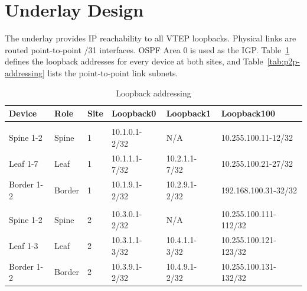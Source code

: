 \section{Underlay Design}
The underlay provides IP reachability to all VTEP loopbacks. Physical links are routed point‑to‑point /31 interfaces. OSPF Area 0 is used as the IGP. Table~\ref{tab:loopback-addressing} defines the loopback addresses for every device at both sites, and Table~\ref{tab:p2p-addressing} lists the point‑to‑point link subnets.

\begin{table}[!htbp]
\centering
\small
\begin{tabularx}{\textwidth}{@{}l l l l X X@{}}
\toprule
\textbf{Device} & \textbf{Role} & \textbf{Site} & \textbf{Loopback0} & \textbf{Loopback1} & \textbf{Loopback100} \\
\midrule
\rowcolor[gray]{0.9} \multicolumn{6}{l}{\textbf{Site 1 Switches}} \\
Spine 1-2 & Spine & 1 & 10.1.0.1-2/32 & N/A & 10.255.100.11-12/32 \\
Leaf 1-7 & Leaf & 1 & 10.1.1.1-7/32 & 10.2.1.1-7/32 & 10.255.100.21-27/32 \\
Border 1-2 & Border & 1 & 10.1.9.1-2/32 & 10.2.9.1-2/32 & 192.168.100.31-32/32 \\
\rowcolor[gray]{0.9} \multicolumn{6}{l}{\textbf{Site 2 Switches}} \\
Spine 1-2 & Spine & 2 & 10.3.0.1-2/32 & N/A & 10.255.100.111-112/32 \\
Leaf 1-3 & Leaf & 2 & 10.3.1.1-3/32 & 10.4.1.1-3/32 & 10.255.100.121-123/32 \\
Border 1-2 & Border & 2 & 10.3.9.1-2/32 & 10.4.9.1-2/32 & 10.255.100.131-132/32 \\
\bottomrule
\end{tabularx}
\caption{Loopback addressing}
\label{tab:loopback-addressing}
\end{table}

